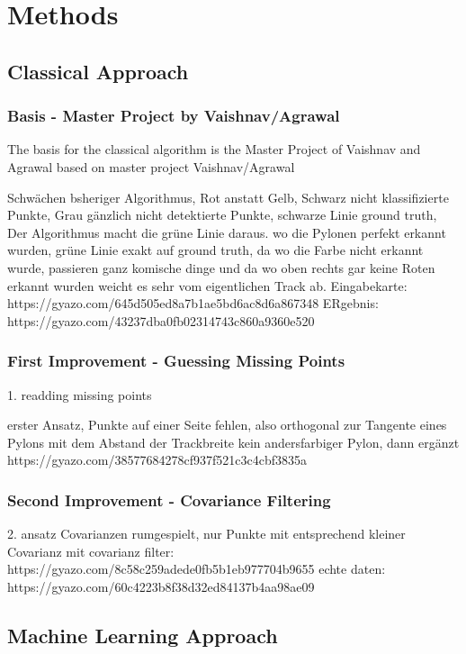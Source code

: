 \graphicspath{{Chapter/Figs/methods/}}
\chapter{Methods}

\section{Classical Approach}

\subsection{Basis - Master Project by Vaishnav/Agrawal}
The basis for the classical algorithm is the Master Project of Vaishnav and Agrawal
based on master project Vaishnav/Agrawal

Schwächen bsheriger Algorithmus, Rot anstatt Gelb, Schwarz nicht klassifizierte Punkte, Grau gänzlich nicht detektierte Punkte,
schwarze Linie ground truth, Der Algorithmus macht die grüne Linie daraus.
wo die Pylonen perfekt erkannt wurden, grüne Linie exakt auf ground truth,
da wo die Farbe nicht erkannt wurde, passieren ganz komische dinge
und da wo oben rechts gar keine Roten erkannt wurden weicht es sehr vom eigentlichen Track ab.
Eingabekarte: https://gyazo.com/645d505ed8a7b1ae5bd6ac8d6a867348
ERgebnis: https://gyazo.com/43237dba0fb02314743c860a9360e520

\subsection{First Improvement - Guessing Missing Points}
1. readding missing points

erster Ansatz, Punkte auf einer Seite fehlen,
also orthogonal zur Tangente eines Pylons mit dem Abstand der Trackbreite kein andersfarbiger Pylon, dann ergänzt
https://gyazo.com/38577684278cf937f521c3c4cbf3835a

\subsection{Second Improvement - Covariance Filtering}

2. ansatz Covarianzen rumgespielt, nur Punkte mit entsprechend kleiner Covarianz
mit covarianz filter: https://gyazo.com/8c58c259adede0fb5b1eb977704b9655
echte daten:
https://gyazo.com/60c4223b8f38d32ed84137b4aa98ae09

\section{Machine Learning Approach}
